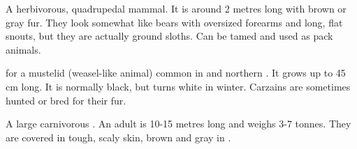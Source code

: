 \begin{gloss}







\begin{comment}
\paragraph{\belwan}
\end{comment}
\gitem{\belwan}
A herbivorous, quadrupedal mammal. 
It is around 2 metres long with brown or gray fur. 
They look somewhat like bears with oversized forearms and long, flat snouts, but they are actually ground sloths. 
Can be tamed and used as pack animals. 








\begin{comment}
\paragraph{carzain (animal)}
\end{comment}
 for a mustelid (weasel-like animal) common in  and northern . 
It grows up to 45 cm long. 
It is normally black, but turns white in winter. 
Carzains are sometimes hunted or bred for their fur. 







\begin{comment}
\paragraph{\corgorah}
\end{comment}
\gitem[\corgoroth]{\corgorah}
A large carnivorous . 
An adult is 10-15 metres long and weighs 3-7 tonnes. 
They are covered in tough, scaly skin, brown and gray in \colour. 












\end{gloss}
